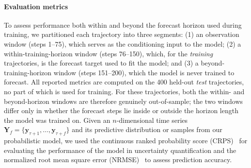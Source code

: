 \documentclass[preprint,12pt,authoryear]{elsarticle}
\newcommand{\oldrev}[1]{#1}
\newcommand{\rev}[1]{#1}
\newcommand{\rev}[1]{\textcolor{blue}{#1}}
\begin{document}
\paragraph{Evaluation metrics}
\rev{To assess performance both within and beyond the forecast horizon used during training, we partitioned each trajectory into three segments: (1) an observation window (steps 1--75), which serves as the conditioning input to the model; (2) a within-training-horizon window (steps 76--150), which, for the \emph{training} trajectories, is the forecast target used to fit the model; and (3) a beyond-training-horizon window (steps 151--200), which the model is never trained to forecast. All reported metrics are computed on the 400 held-out \emph{test} trajectories, no part of which is used for training. For these trajectories, both the within- and beyond-horizon windows are therefore genuinely out-of-sample; the two windows differ only in whether the forecast steps lie inside or outside the horizon length the model was trained on.} Given an $n$-dimensional time series $\mathbf{Y}_f = \{\mathbf{y}_{\tau+1}, \ldots, \mathbf{y}_{\tau+f}\}$ and its predictive distribution or samples from our probabilistic model, we used the continuous ranked probability score (CRPS)~\citep{gneiting2007strictly} for evaluating the performance of the model in uncertainty quantification and the normalized root mean square error (NRMSE)~\citep{hyndman2006another} to assess \oldrev{prediction accuracy}.
\end{document}
